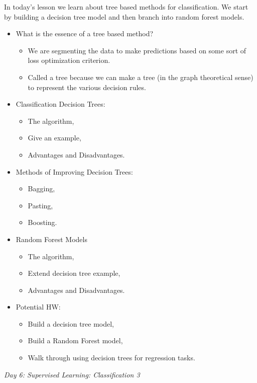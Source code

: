 \documentclass[12pt]{article}
\begin{document}
	\noindent
	In today's lesson we learn about tree based methods for classification. We start by building a decision tree model and then branch into random forest models.
	\begin{itemize}
		\item What is the essence of a tree based method?
			\begin{itemize}
				\item We are segmenting the data to make predictions based on some sort of loss optimization criterion.
				\item Called a tree because we can make a tree (in the graph theoretical sense) to represent the various decision rules.
			\end{itemize}
		\item Classification Decision Trees:
			\begin{itemize}
				\item The algorithm,
				\item Give an example,
				\item Advantages and Disadvantages.
			\end{itemize}
		\item Methods of Improving Decision Trees:
			\begin{itemize}
				\item Bagging,
				\item Pasting,
				\item Boosting.
			\end{itemize}
		\item Random Forest Models
			\begin{itemize}
				\item The algorithm,
				\item Extend decision tree example,
				\item Advantages and Disadvantages.
			\end{itemize}
		\item Potential HW:
			\begin{itemize}
				\item Build a decision tree model,
				\item Build a Random Forest model,
				\item Walk through using decision trees for regression tasks.
			\end{itemize}
	\end{itemize}
	
	\vspace{2mm}
	\noindent
	\textit{\large{Day 6: Supervised Learning: Classification 3}}
	
\end{document}
